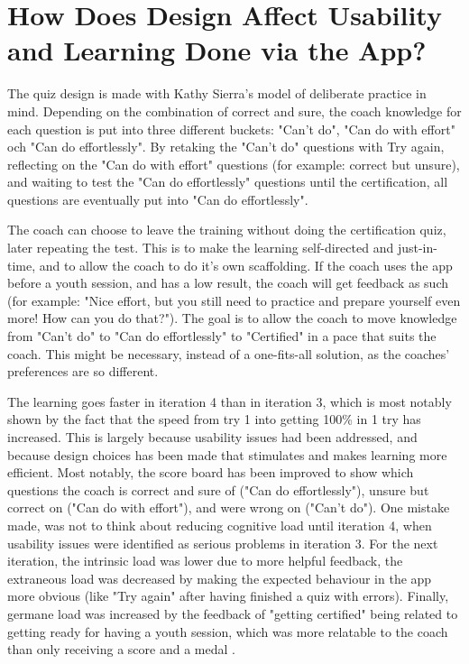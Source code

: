 
\section{How Does Design Affect Usability and Learning Done via the App?}

  The quiz design is made with Kathy Sierra's model of deliberate practice in mind. \cite{sierra} Depending on the combination of correct and sure, the coach knowledge for each question is put into three different buckets: "Can't do", "Can do with effort" och "Can do effortlessly". By retaking the "Can't do" questions with Try again, reflecting on the "Can do with effort" questions (for example: correct but unsure), and waiting to test the "Can do effortlessly" questions until the certification, all questions are eventually put into "Can do effortlessly".

  The coach can choose to leave the training without doing the certification quiz, later repeating the test. This is to make the learning self-directed and just-in-time, and to allow the coach to do it's own scaffolding. If the coach uses the app before a youth session, and has a low result, the coach will get feedback as such (for example: "Nice effort, but you still need to practice and prepare yourself even more! How can you do that?"). The goal is to allow the coach to move knowledge from "Can't do" to "Can do effortlessly" to "Certified" in a pace that suits the coach. This might be necessary, instead of a one-fits-all solution, as the coaches' preferences are so different.

  The learning goes faster in iteration 4 than in iteration 3, which is most notably shown by the fact that the speed from try 1 into getting 100\% in 1 try has increased. This is largely because usability issues had been addressed, and because design choices has been made that stimulates and makes learning more efficient. Most notably, the score board has been improved to show which questions the coach is correct and sure of ("Can do effortlessly"), unsure but correct on ("Can do with effort"), and were wrong on ("Can't do"). One mistake made, was not to think about reducing cognitive load \citep{sweller} until iteration 4, when usability issues were identified as serious problems in iteration 3. For the next iteration, the intrinsic load was lower due to more helpful feedback, the extraneous load was decreased by making the expected behaviour in the app more obvious (like "Try again" after having finished a quiz with errors). Finally, germane load was increased by the feedback of "getting certified" being related to getting ready for having a youth session, which was more relatable to the coach than only receiving a score and a medal \citep{sierra}.

